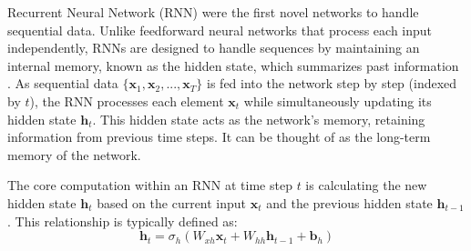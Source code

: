 Recurrent Neural Network (RNN) were the first novel networks to handle sequential data. Unlike feedforward neural networks that process each input independently, RNNs are designed to handle sequences by maintaining an internal memory, known as the hidden state, which summarizes past information \autocite{geron2022hands}. As sequential data \( \{ \bm{x}_1, \bm{x}_2, ..., \bm{x}_T \} \) is fed into the network step by step (indexed by \( t \)), the RNN processes each element \( \bm{x}_t \) while simultaneously updating its hidden state \( \bm{h}_t \). This hidden state acts as the network's memory, retaining information from previous time steps. It can be thought of as the long-term memory of the network.

The core computation within an RNN at time step \( t \) is calculating the new hidden state \( \bm{h}_t \) based on the current input \( \bm{x}_t \) and the previous hidden state \( \bm{h}_{t-1} \). This relationship is typically defined as:
\begin{equation}
  \bm{h}_t = \sigma_h (W_{xh} \bm{x}_t + W_{hh} \bm{h}_{t-1} + \bm{b}_h)
  \label{eq:rnn_hidden_state}
\end{equation}


